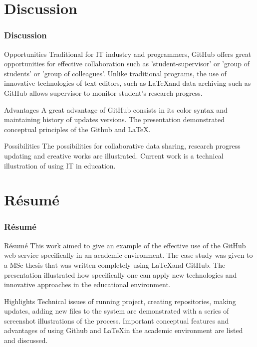 \documentclass[pdflatex,compress,8pt,
	xcolor={dvipsnames,dvipsnames,svgnames,x11names,table},
	hyperref={
	breaklinks = true, 
	pdfauthor={Lemenkova Polina}, 
	pdfsubject={Preentation}, 
	pdfcreator={Lemenkova Polina}, 
	pdfproducer={Lemenkova Polina}, 
	colorlinks=true,linkcolor=blue, 
	citecolor=NavyBlue, 
	urlcolor = NavyBlue, 
	breaklinks = true}]{beamer}
\begin{document}
\section{Discussion}
\begin{frame}\frametitle{Discussion}

\begin{alertblock}{Opportunities}
Traditional for IT industry and programmers, GitHub offers great opportunities for effective collaboration such as 'student-supervisor' or 'group of students' or 'group of colleagues'. Unlike traditional programs, the use of innovative technologies of text editors, such as \LaTeX \space and data archiving such as GitHub allows supervisor to monitor student’s research progress.
\end{alertblock}

\begin{block}{Advantages}
A great advantage of GitHub consists in its color syntax and maintaining history of updates versions. The presentation demonstrated conceptual principles of the Github and \LaTeX. 
\end{block}

\begin{block}{Possibilities}
The possibilities for collaborative data sharing, research progress updating and creative works are illustrated. Current work is a technical illustration of using IT in education.
\end{block}

\end{frame}

\section{R\'{e}sum\'{e}}
\begin{frame}\frametitle{R\'{e}sum\'{e}}
\begin{alertblock}{R\'{e}sum\'{e}}
This work aimed to give an example of the effective use of the GitHub web service specifically in an academic environment. The case study was given to a MSc thesis that was written completely using  \LaTeX \space and GitHub. The presentation illustrated how specifically one can apply new technologies and innovative approaches in the educational environment. 
\end{alertblock}

\begin{block}{Highlights}
Technical issues of running project, creating repositories, making updates, adding new files to the system are demonstrated with a series of screenshot illustrations of the process. Important conceptual features and advantages of using Github and \LaTeX \space in the academic environment are listed and discussed. 
\end{block}

\end{frame}
\end{document}
